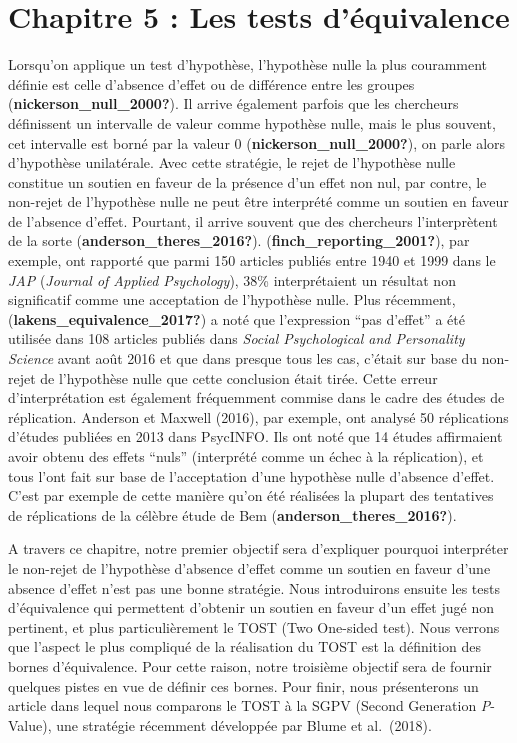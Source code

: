 \documentclass[
  english,
  man]{apa6}
\author{\phantom{0}}
\date{}
\affiliation{\phantom{0}}
\begin{document}
\hypertarget{chapitre-5-les-tests-duxe9quivalence}{%
\section{Chapitre 5 : Les tests d'équivalence}\label{chapitre-5-les-tests-duxe9quivalence}}

Lorsqu'on applique un test d'hypothèse, l'hypothèse nulle la plus couramment définie est celle d'absence d'effet ou de différence entre les groupes (\textbf{nickerson\_null\_2000?}). Il arrive également parfois que les chercheurs définissent un intervalle de valeur comme hypothèse nulle, mais le plus souvent, cet intervalle est borné par la valeur 0 (\textbf{nickerson\_null\_2000?}), on parle alors d'hypothèse unilatérale. Avec cette stratégie, le rejet de l'hypothèse nulle constitue un soutien en faveur de la présence d'un effet non nul, par contre, le non-rejet de l'hypothèse nulle ne peut être interprété comme un soutien en faveur de l'absence d'effet. Pourtant, il arrive souvent que des chercheurs l'interprètent de la sorte (\textbf{anderson\_theres\_2016?}). (\textbf{finch\_reporting\_2001?}), par exemple, ont rapporté que parmi 150 articles publiés entre 1940 et 1999 dans le \emph{JAP} (\emph{Journal of Applied Psychology}), 38\% interprétaient un résultat non significatif comme une acceptation de l'hypothèse nulle. Plus récemment, (\textbf{lakens\_equivalence\_2017?}) a noté que l'expression ``pas d'effet'' a été utilisée dans 108 articles publiés dans \emph{Social Psychological and Personality Science} avant août 2016 et que dans presque tous les cas, c'était sur base du non-rejet de l'hypothèse nulle que cette conclusion était tirée. Cette erreur d'interprétation est également fréquemment commise dans le cadre des études de réplication. Anderson et Maxwell (2016), par exemple, ont analysé 50 réplications d'études publiées en 2013 dans PsycINFO. Ils ont noté que 14 études affirmaient avoir obtenu des effets ``nuls'' (interprété comme un échec à la réplication), et tous l'ont fait sur base de l'acceptation d'une hypothèse nulle d'absence d'effet. C'est par exemple de cette manière qu'on été réalisées la plupart des tentatives de réplications de la célèbre étude de Bem (\textbf{anderson\_theres\_2016?}).

A travers ce chapitre, notre premier objectif sera d'expliquer pourquoi interpréter le non-rejet de l'hypothèse d'absence d'effet comme un soutien en faveur d'une absence d'effet n'est pas une bonne stratégie. Nous introduirons ensuite les tests d'équivalence qui permettent d'obtenir un soutien en faveur d'un effet jugé non pertinent, et plus particulièrement le TOST (Two One-sided test). Nous verrons que l'aspect le plus compliqué de la réalisation du TOST est la définition des bornes d'équivalence. Pour cette raison, notre troisième objectif sera de fournir quelques pistes en vue de définir ces bornes. Pour finir, nous présenterons un article dans lequel nous comparons le TOST à la SGPV (Second Generation \emph{P}-Value), une stratégie récemment développée par Blume et al.~(2018).
\end{document}
